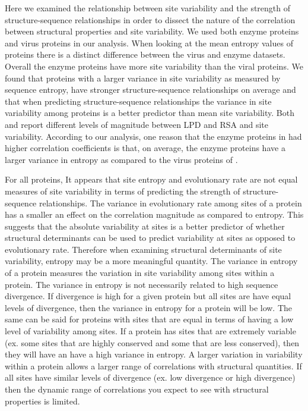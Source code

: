 \documentclass[12pt]{article}
\begin{document}
\indent Here we examined the relationship between site variability and the strength of structure-sequence relationships in order to dissect the nature of the correlation between structural properties and site variability. We used both enzyme proteins and virus proteins in our analysis. When looking at the mean entropy values of proteins there is a distinct difference between the virus and enzyme datasets. Overall the enzyme proteins have more site variability than the viral proteins.  We found that proteins with a larger variance in site variability as measured by sequence entropy, have stronger structure-sequence relationships on average and that when predicting structure-sequence relationships the variance in site variability among proteins is a better predictor than mean site variability.  Both \cite{Yehetal2014a} and \cite{Shahmoradietal2014} report different levels of magnitude between LPD and RSA and site variability. According to our analysis, one reason that the enzyme proteins in \cite{Yehetal2014a} had higher correlation coefficients is that, on average, the enzyme proteins have a larger variance in entropy as compared to the virus proteins of \cite{Shahmoradietal2014}. 

\indent For all proteins, It appears that site entropy and evolutionary rate are not equal measures of site variability in terms of predicting the strength of structure-sequence relationships. The variance in evolutionary rate among sites of a protein has a smaller an effect on the correlation magnitude as compared to entropy. This suggests that the absolute variability at sites is a better predictor of whether structural determinants can be used to predict variability at sites  as opposed to evolutionary rate. Therefore when examining structural determinants of site variability, entropy may be a more meaningful quantity. The variance in entropy of a protein measures the variation in site variability among sites within a protein. The variance in entropy is not necessarily related to high sequence divergence. If divergence is high for a given protein but all sites are have equal levels of divergence, then the variance in entropy for a protein will be low. The same can be said for proteins with sites that are equal in terms of having a low level of variability among sites. If a protein has sites that are extremely variable (ex. some sites that are highly conserved and some that are less conserved), then they will have an have a high variance in entropy.  A larger variation in variability within a protein allows a larger range of correlations with structural quantities. If all sites have similar levels of divergence (ex. low divergence or high divergence) then the dynamic range of correlations you expect to see with structural properties is limited. 
\end{document}
